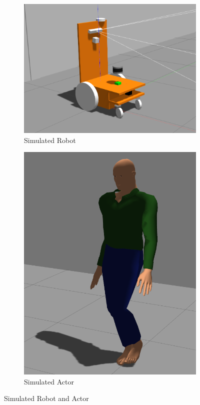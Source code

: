 \vspace{-10pt}

\begin{figure}[H]
  \centering
  \begin{subfigure}{0.40\textwidth}
    \centering
    \includegraphics[keepaspectratio, scale=0.15]{images/sim-robot.png}
    \caption{Simulated Robot}
    \label{Fig:sim-robot}
  \end{subfigure}
  \begin{subfigure}{0.40\textwidth}
    \centering
    \includegraphics[keepaspectratio, scale=0.15]{images/sim-actor.png}
    \caption{Simulated Actor}
    \label{Fig:sim-actor}
  \end{subfigure}
  \caption{Simulated Robot and Actor}
  \label{Fig:sim-robot-actor}
\end{figure}

